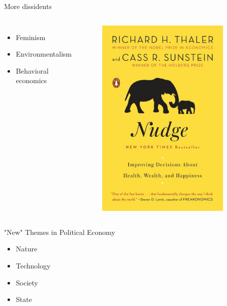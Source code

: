 \documentclass{beamer}
\begin{document}
\begin{frame}{More dissidents}
\begin{columns}[onlytextwidth]
\begin{itemize}
    \item Feminism %
    \item Environmentalism %
    \item Behavioral economics
\end{itemize}
\begin{figure}
    \centering
    \includegraphics[width=0.9\textwidth]{../img/better nudge.jpg}
\end{figure}
\end{columns}
\end{frame}

\begin{frame}{"New" Themes in Political Economy} 
\begin{itemize}
    \item Nature %
    \item Technology %
    \item Society %
    \item State
\end{itemize}{}
\end{frame}{}
\end{document}
